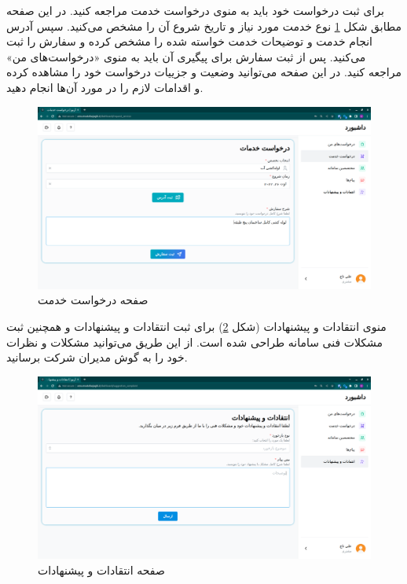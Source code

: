 برای ثبت درخواست خود باید به منوی درخواست خدمت مراجعه کنید.
در این صفحه مطابق شکل \ref{customer-request} نوع خدمت مورد نیاز و تاریخ شروع آن را مشخص می‌کنید.
سپس آدرس انجام خدمت و توضیحات خدمت خواسته شده را مشخص کرده و سفارش را ثبت می‌کنید.
پس از ثبت سفارش برای پیگیری آن باید به منوی «درخواست‌های من» مراجعه کنید.
در این صفحه می‌توانید وضعیت و جزییات درخواست خود را مشاهده کرده و اقدامات لازم را در مورد آن‌ها انجام دهید.

\begin{figure}[h]
	\centering
	\includegraphics[width=\textwidth]{figs/user-guide/customer-request}
	\caption{صفحه درخواست خدمت}
	\label{customer-request}
\end{figure}

منوی انتقادات و پیشنهادات (شکل \ref{customer-technical-feedback}) برای ثبت انتقادات و پیشنهادات و همچنین ثبت مشکلات فنی سامانه طراحی شده است.
از این طریق می‌توانید مشکلات و نظرات خود را به گوش مدیران شرکت برسانید.

\begin{figure}[h]
	\centering
	\includegraphics[width=\textwidth]{figs/user-guide/customer-technical-feedback}
	\caption{صفحه انتقادات و پیشنهادات}
	\label{customer-technical-feedback}
\end{figure}



